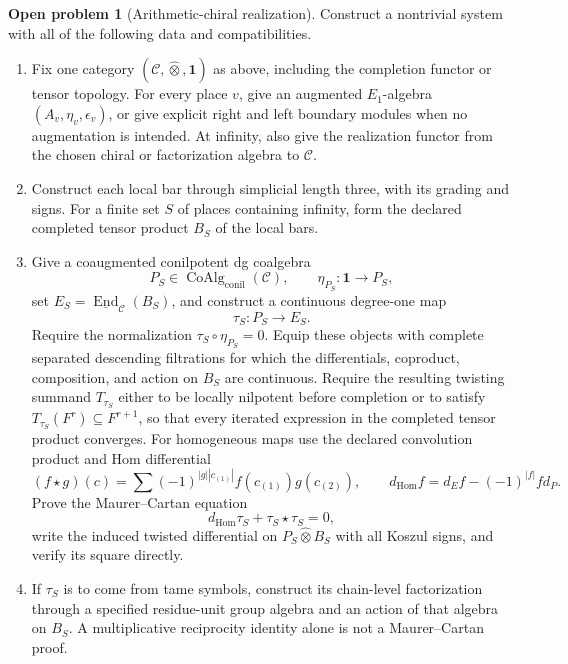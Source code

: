 \documentclass[11pt]{article}
\theoremstyle{plain}
\theoremstyle{definition}
\newtheorem{openproblem}[theorem]{Open problem}
\theoremstyle{remark}
\newcommand{\one}{\mathbf 1}
\begin{document}
\begin{openproblem}[Arithmetic-chiral realization]
\label{problem:bar}
Construct a nontrivial system with all of the following data and
compatibilities.

\begin{enumerate}
\item Fix one category
\((\mathcal C,\widehat\otimes,\one)\) as above, including the completion
functor or tensor topology.  For every place \(v\), give an augmented
\(E_1\)-algebra \((A_v,\eta_v,\epsilon_v)\), or give explicit right and
left boundary modules when no augmentation is intended.  At infinity,
also give the realization functor from the chosen chiral or factorization
algebra to \(\mathcal C\).

\item Construct each local bar through simplicial length three, with its
grading and signs.  For a finite set \(S\) of places containing infinity,
form the declared completed tensor product \(B_S\) of the local bars.

\item Give a coaugmented conilpotent dg coalgebra
\[
 P_S\in\operatorname{CoAlg}_{\mathrm{conil}}(\mathcal C),
 \qquad \eta_{P_S}:\one\longrightarrow P_S,
\]
set
\(E_S=\underline{\operatorname{End}}_{\mathcal C}(B_S)\), and construct a
continuous degree-one map
\[
 \tau_S:P_S\longrightarrow E_S.
\]
Require the normalization \(\tau_S\circ\eta_{P_S}=0\).  Equip these
objects with complete separated descending filtrations for which the
differentials, coproduct, composition, and action on \(B_S\) are continuous.
Require the resulting twisting summand \(T_{\tau_S}\) either to be locally
nilpotent before completion or to satisfy
\(T_{\tau_S}(F^r)\subseteq F^{r+1}\), so that every iterated expression in
the completed tensor product converges.
For homogeneous maps use the declared convolution product and Hom
differential
\[
 (f\star g)(c)=
 \sum(-1)^{|g||c_{(1)}|}f(c_{(1)})g(c_{(2)}),
 \qquad
 d_{\mathrm{Hom}}f=d_Ef-(-1)^{|f|}f d_P.
\]
Prove the Maurer--Cartan equation
\[
 d_{\mathrm{Hom}}\tau_S+\tau_S\star\tau_S=0,
\]
write the induced twisted differential on
\(P_S\widehat\otimes B_S\) with all Koszul signs, and verify its square
directly.

\item If \(\tau_S\) is to come from tame symbols, construct its
chain-level factorization through a specified residue-unit group algebra
and an action of that algebra on \(B_S\).  A multiplicative reciprocity
identity alone is not a Maurer--Cartan proof.


\end{enumerate}
\end{openproblem}
\end{document}
